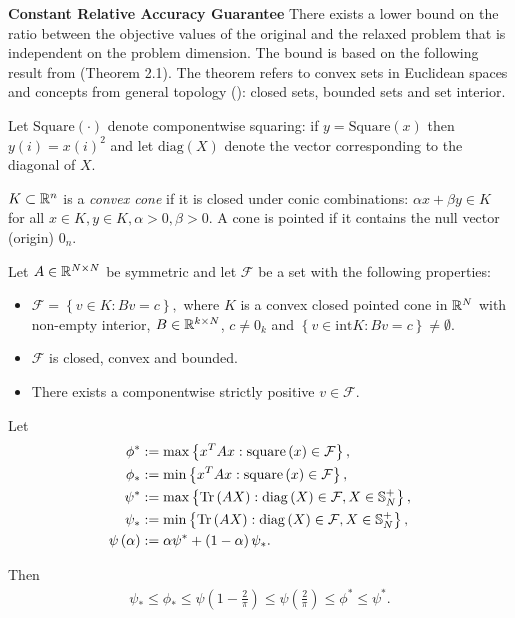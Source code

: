 \noindent\textbf{Constant Relative Accuracy Guarantee}
There exists a lower bound on the ratio between the objective values of the original
and the relaxed problem that is independent on the problem dimension. The bound is
based on the following result from \cite{Nesterov98globalquadratic} (Theorem 2.1).
The theorem refers to convex sets in Euclidean spaces \cite{Boyd:2004:CO:993483} and
concepts from general topology (\cite{bourbaki1998general}): closed sets,
bounded sets and set interior.
\begin{notation}
Let $\mathrm{Square}(\cdot)$ denote componentwise squaring: if
$y = \mathrm{Square}(x)$ then $y(i) = x(i)^2$ and let $\mathrm{diag}(X)$
denote the vector corresponding to the diagonal of $X$.
\end{notation}
\begin{definition}
$K \subset \mathbb{R}^n$ is a \emph{convex cone} if it is closed under conic combinations:
$\alpha x + \beta y \in K$ for all $x \in K, y \in K, \alpha > 0, \beta > 0$.
A cone is pointed if it contains the null vector (origin) $0_n$.
\end{definition}

\begin{theorem}\label{thm:nesterov}
Let $A \in \mathbb{R}^{N \times N}$ be symmetric and let $\mathcal{F}$ be a set with the following properties:
\begin{itemize}
\item $\mathcal{F} = \left\{ v \in K: B v = c  \right\},$ where $K$ is a convex closed pointed
cone in $\mathbb{R}^N$ with non-empty interior, $B \in \mathbb{R}^{k\times N}$, $c \neq 0_k$ and
$\left\{  v \in \mathrm{int}K : B v = c \right\} \neq \emptyset$.
\item $\mathcal{F}$ is closed, convex and bounded.
\item There exists a componentwise strictly positive $v \in \mathcal{F}$.

\end{itemize}
Let
\begin{align*}
\phi^* &:= \mathrm{max}\left\{  x^T A x : \mathrm{square}\left(x\right) \in \mathcal{F}  \right\},\\
\phi_* &:= \mathrm{min}\left\{  x^T A x : \mathrm{square}\left(x\right) \in \mathcal{F}  \right\},\\
\psi^* &:= \mathrm{max}\left\{  \mathrm{Tr}\left(A X\right): \mathrm{diag}\left(X\right) \in \mathcal{F}, X \in \mathbb{S}_N^+  \right\},\\
\psi_* &:= \mathrm{min}\left\{  \mathrm{Tr}\left(A X\right): \mathrm{diag}\left(X\right) \in \mathcal{F}, X \in \mathbb{S}_N^+  \right\},\\
\psi\left(\alpha\right) &:= \alpha \psi^* + \left(1-\alpha\right)\psi_*.
\end{align*}

Then
\begin{equation}\label{eq:sdpBound}
\begin{aligned}
\psi_* \leq \phi_* \leq \psi \left(1 - \frac{2}{\pi}\right) \leq \psi\left(\frac{2}{\pi}\right) \leq \phi^* \leq \psi^*.
\end{aligned}
\end{equation}
\end{theorem}

